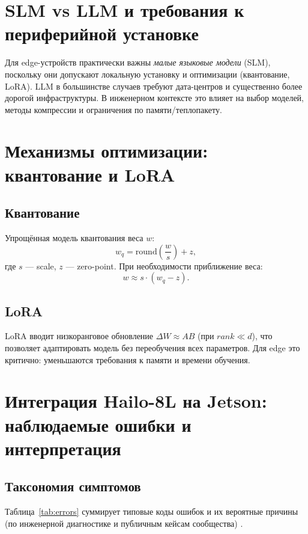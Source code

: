\documentclass[11pt,a4paper]{article}
\begin{document}
\section{SLM vs LLM и требования к периферийной установке}
Для edge-устройств практически важны \textit{малые языковые модели} (SLM), поскольку они допускают локальную установку и оптимизации (квантование, LoRA). LLM в большинстве случаев требуют дата-центров и существенно более дорогой инфраструктуры. В инженерном контексте это влияет на выбор моделей, методы компрессии и ограничения по памяти/теплопакету.

\section{Механизмы оптимизации: квантование и LoRA}
\subsection{Квантование}
Упрощённая модель квантования веса $w$:
\begin{equation}
  w_q = \mathrm{round}\left(\frac{w}{s}\right) + z,
\end{equation}
где $s$ — scale, $z$ — zero-point. При необходимости приближение веса:
\begin{equation}
  w \approx s \cdot (w_q - z).
\end{equation}

\subsection{LoRA}
LoRA вводит низкоранговое обновление $\Delta W \approx A B$ (при $rank \ll d$), что позволяет адаптировать модель без переобучения всех параметров. Для edge это критично: уменьшаются требования к памяти и времени обучения.

\section{Интеграция Hailo-8L на Jetson: наблюдаемые ошибки и интерпретация}
\subsection{Таксономия симптомов}
Таблица~\ref{tab:errors} суммирует типовые коды ошибок и их вероятные причины (по инженерной диагностике и публичным кейсам сообщества) \citep{hailo_fw_identify_forum,hailo_fw_missing_forum,rpi_fw_timeout_forum}.
\end{document}
